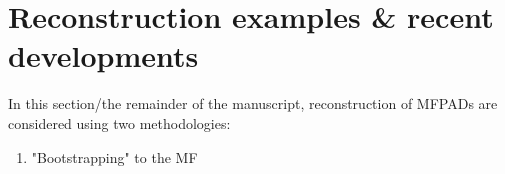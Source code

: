 \section{Reconstruction examples & recent developments}

In this section/the remainder of the manuscript, reconstruction of MFPADs are considered using two methodologies:

\begin{enumerate}
\item "Bootstrapping" to the MF
\end{enumerate}